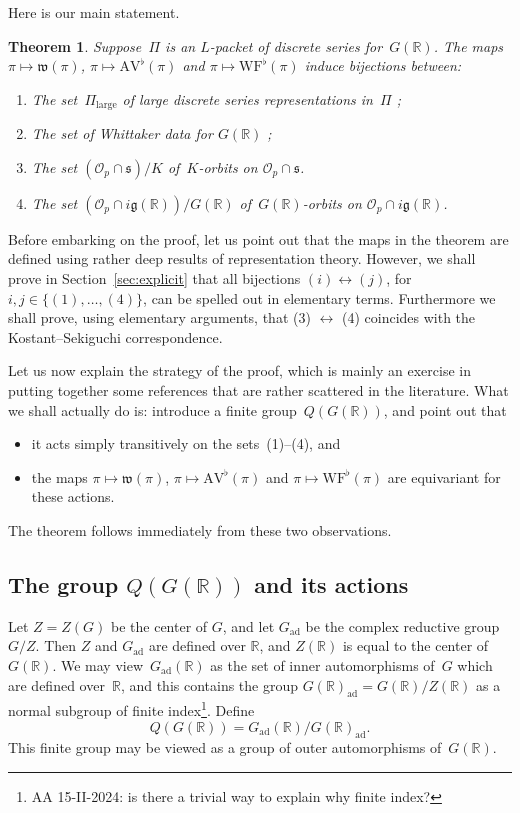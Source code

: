 \documentclass[10pt,leqno]{article}
\newtheorem{theorem}[equation]{Theorem}
\newcommand{\Gad}{G_\mathrm{ad}}
\renewcommand{\O}{\mathcal O}
\newcommand{\R}{\mathbb R}
\newcommand{\g}{\mathfrak g}
\newcommand{\s}{\mathfrak s}
\newcommand{\AV}{\mathrm{AV}}
\newcommand{\WF}{\mathrm{WF}}
\newcommand{\Op}{\O_p}
\begin{document}
Here is our main statement.

\begin{theorem} \label{th:main} Suppose~$\Pi$ is an $L$-packet of discrete series for~$G(\R)$. 
The maps $\pi \mapsto \mathfrak{w}(\pi)$, $\pi \mapsto \AV^\flat(\pi)$ and $\pi\mapsto \WF^\flat(\pi)$ induce bijections between:
\begin{enumerate}
\item[(1)] The set~$\Pi_{\mathrm{large}}$ of large discrete series representations in~$\Pi$ ;
\item[(2)] The set of Whittaker data for $G(\R)$ ;
\item[(3)] The set $(\Op \cap \s)/K$ of~$K$-orbits on $\mathcal{O}_p \cap \s$.
\item[(4)] The set $(\Op \cap i\g(\R))/G(\R)$ of~$G(\R)$-orbits on $\mathcal{O}_p \cap  i \g(\R)$.
\end{enumerate}
\end{theorem}

Before embarking on the proof, let us point out that the maps in the theorem are defined using rather deep results of representation theory. However, we shall prove in Section~\ref{sec:explicit} that all bijections $(i) \leftrightarrow (j)$, for $i,j \in \{(1), \dots, (4)\}$, can be spelled out in elementary terms. Furthermore we shall prove, using elementary arguments, that (3) $\leftrightarrow$ (4) coincides with the Kostant--Sekiguchi correspondence.  



Let us now explain the strategy of the proof, which is mainly an exercise in putting together some references that are rather scattered in the literature. What we shall actually do is: introduce a finite group~$Q(G(\R))$, and point out that 
\begin{itemize}
\item[(i)] it acts simply transitively on the sets~(1)--(4), and 
\item[(ii)] the maps $\pi \mapsto \mathfrak{w}(\pi)$, $\pi \mapsto \AV^\flat(\pi)$ and $\pi\mapsto \WF^\flat(\pi)$  are equivariant for these actions.
\end{itemize}
The theorem follows immediately from these two observations. 

\subsection{The group $Q(G(\R))$ and its actions} Let $Z=Z(G)$ be the center of $G$, and let $\Gad$ be the complex reductive group~$G/Z$.
Then $Z$ and $\Gad$ are defined over $\R$, and $Z(\R)$ is equal to the center of $G(\R)$. We may view~$\Gad(\R)$ as the set of inner automorphisms of~$G$ which are defined over~$\R$, and this contains the group $G(\R)_{\mathrm{ad}}=G(\R)/Z(\R)$ as a normal subgroup of finite index\footnote{AA 15-II-2024: is there a trivial way to explain why finite index?}.
Define 
$$
Q(G(\R))=\Gad(\R)/G(\R)_{\mathrm{ad}}.
$$
This finite group may be viewed as a group of outer automorphisms of~$G(\R)$. 
\end{document}
